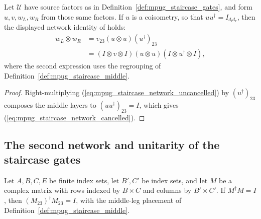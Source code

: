\begin{lemma}
    \label{thm:mpug_staircase_network_cancelled}
    \leanok
    Let $\mathcal U$ have source factors as in
    Definition~\ref{def:mpug_staircase_gates}, and form $u,v,w_L,w_R$
    from those same factors. If $u$ is a coisometry, so that
    $uu^\dagger=I_{d_ld_r}$, then the displayed network identity of
    \cite[lines~969--974]{FrancoRubio2025MPUGauging} holds:
    \begin{align}
        w_L\otimes w_R
         & =v_{23}(u\otimes u)(u^\dagger)_{23} \\
         & =(I\otimes v\otimes I)(u\otimes u)
        (I\otimes u^\dagger\otimes I),
        \label{eq:mpug_staircase_network_cancelled}
    \end{align}
    where the second expression uses the regrouping of
    Definition~\ref{def:mpug_staircase_middle}.
\end{lemma}

\begin{proof}\leanok
    Right-multiplying (\ref{eq:mpug_staircase_network_uncancelled}) by
    $(u^\dagger)_{23}$ composes the middle layers to
    $(uu^\dagger)_{23}=I$, which gives
    (\ref{eq:mpug_staircase_network_cancelled}).
\end{proof}

\subsection{The second network and unitarity of the staircase gates}

\begin{lemma}
    \label{thm:mpug_staircase_middle_isometry}
    \leanok
    Let $A,B,C,E$ be finite index sets, let $B',C'$ be index sets, and let
    $M$ be a complex matrix with rows indexed by $B\times C$ and columns
    by $B'\times C'$. If $M^\dagger M=I$, then
    $(M_{23})^\dagger M_{23}=I$, with the middle-leg placement of
    Definition~\ref{def:mpug_staircase_middle}.
\end{lemma}

